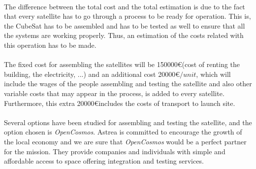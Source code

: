 \paragraph{}The difference between the total cost and the total estimation is due to the fact that every satellite has to go through a process to be ready for operation. This is, the CubeSat has to be assembled and has to be tested as well to ensure that all the systems are working properly. Thus, an estimation of the costs related with this operation has to be made.

\paragraph{}The fixed cost for assembling the satellites will be 150000\euro (cost of renting the building, the electricity, ...) and an additional cost 20000\euro $ / unit$, which will include the wages of the people assembling and testing the satellite and also other variable costs that may appear in the process, is added to every satellite. Furthermore, this extra 20000\euro includes the costs of transport to launch site.

\paragraph{}Several options have been studied for assembling and testing the satellite, and the option chosen is \textit{OpenCosmos}. Astrea is committed to encourage the growth of the local economy and we are sure that \textit{OpenCosmos} would be a perfect partner for the mission. They provide companies and individuals with simple and affordable access to space offering integration and testing services.